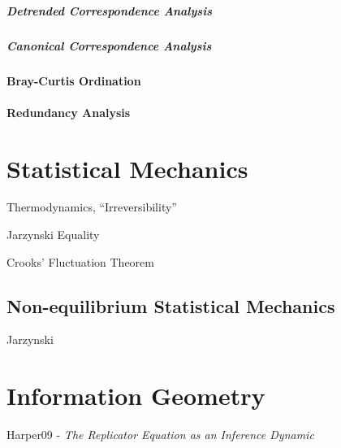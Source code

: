 \subparagraph{Detrended Correspondence Analysis}
\label{sec:detrended_correspondence}\hfill

\subparagraph{Canonical Correspondence Analysis}
\label{sec:canonical_correspondence}\hfill



\paragraph{Bray-Curtis Ordination}\label{sec:bray_curtis_ordination}\hfill

\paragraph{Redundancy Analysis}\label{sec:redundancy_analysis}\hfill



\section{Statistical Mechanics}\label{sec:statistical_mechanics}

Thermodynamics, ``Irreversibility''

Jarzynski Equality

Crooks' Fluctuation Theorem



\subsection{Non-equilibrium Statistical Mechanics}
\label{sec:nonequilibrium_statistical_mechanics}

Jarzynski



\section{Information Geometry}\label{sec:information_geometry}

Harper09 - \emph{The Replicator Equation as an Inference Dynamic}

